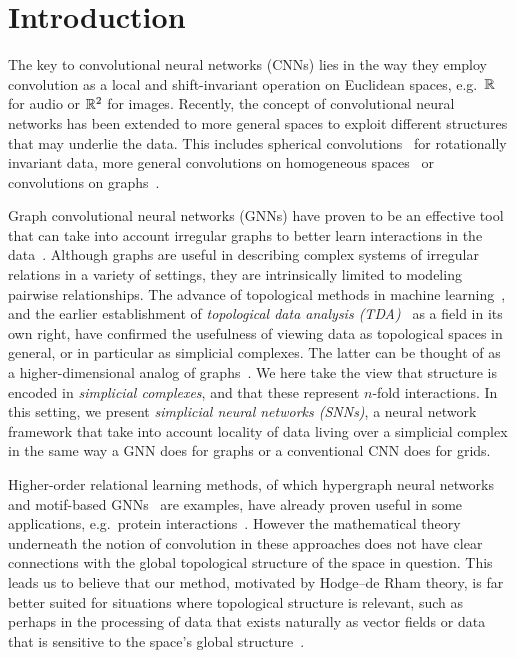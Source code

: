 \section{Introduction}

The key to convolutional neural networks (CNNs) lies in the way they employ convolution as a local and shift-invariant operation on Euclidean spaces, e.g.\ $\mathbb{R}$ for audio or $\mathbb{R}^2$ for images. Recently, the concept of convolutional neural networks has been extended to more general spaces to exploit different structures that may underlie the data. This includes spherical convolutions~\cite{cohen2016group} for rotationally invariant data, more general convolutions on homogeneous spaces~\cite{cohen2019general} or convolutions on graphs~\cite{defferrard2016convolutional}.

Graph convolutional neural networks (GNNs) have proven to be an effective tool that can take into account irregular graphs to better learn interactions in the data~\cite{bronstein2017geometric, wu2020survey,battaglia2018relational}. Although graphs are useful in describing complex systems of irregular relations in a variety of settings, they are intrinsically limited to modeling pairwise relationships. The advance of topological methods in machine learning~\cite{Gabrielsson2020topological, Hofer2019LearningRO, rieck2018neural}, and the earlier establishment of \emph{topological data analysis (TDA)}~\cite{carlsson2008,chazal2017,edelsbrunner2010computational,ghrist2008barcodes} as a field in its own right, have confirmed the usefulness of viewing data as topological spaces in general, or in particular as simplicial complexes. The latter can be thought of as a higher-dimensional analog of graphs~\cite{moore2012,patania2017}. We here take the view that structure is encoded in \emph{simplicial complexes}, and that these represent $n$-fold interactions. In this setting, we present \emph{simplicial neural networks (SNNs)}, a neural network framework that take into account locality of data living over a simplicial complex in the same way a GNN does for graphs or a conventional CNN does for grids.

Higher-order relational learning methods, of which hypergraph neural networks~\cite{feng2018hypergraphs} and motif-based GNNs~\cite{monti2018motif} are examples, have already proven useful in some applications, e.g.\ protein interactions~\cite{ze2020graph}. However the mathematical theory underneath the notion of convolution in these approaches does not have clear connections with the global topological structure of the space in question. This leads us to believe that our method, motivated by Hodge--de Rham theory, is far better suited for situations where topological structure is relevant, such as perhaps in the processing of data that exists naturally as vector fields or data that is sensitive to the space's global structure~\cite{deepsphere}.

